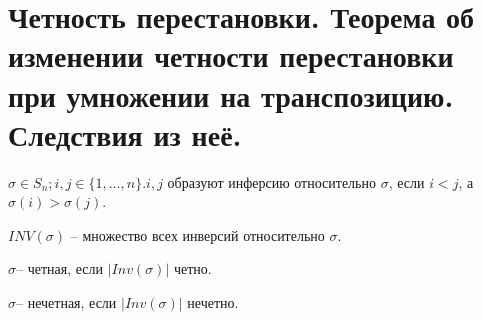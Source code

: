\section{Четность перестановки. Теорема об изменении четности перестановки при умножении на транспозицию. Следствия из неё.}

\begin{Def}
$\sigma \in S_n; i, j \in \{1, \dotsc, n\}. i, j $ образуют инферсию относительно $\sigma$, если $i < j$, а $\sigma(i) > \sigma(j)$.
\end{Def}
\begin{Def}
$INV(\sigma)$ -- множество всех инверсий относительно $\sigma$.
\end{Def}
\begin{Def}
$\sigma $-- четная, если $|Inv(\sigma)|$ четно.
\end{Def}
\begin{Def}
$\sigma $-- нечетная, если $|Inv(\sigma)|$ нечетно.
\end{Def}

